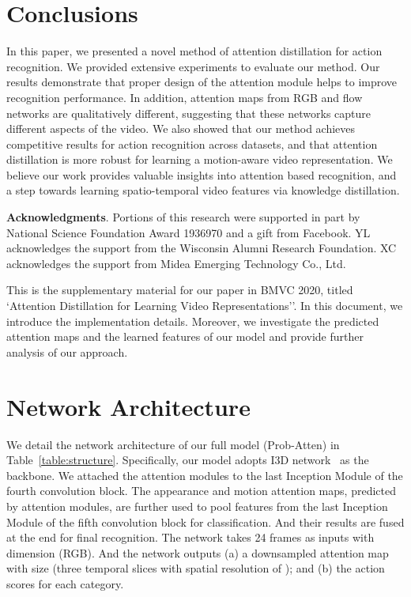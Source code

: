 \documentclass{bmvc2k}
\begin{document}
\section{Conclusions}
In this paper, we presented a novel method of attention distillation for action recognition. We provided extensive experiments to evaluate our method. Our results demonstrate that proper design of the attention module helps to improve recognition performance. In addition, attention maps from RGB and flow networks are qualitatively different, suggesting that these networks capture different aspects of the video. We also showed that our method achieves competitive results for action recognition across datasets, and that attention distillation is more robust for learning a motion-aware video representation. We believe our work provides valuable insights into attention based recognition, and a step towards learning spatio-temporal video features via knowledge distillation. 


\noindent \textbf{Acknowledgments}. Portions of this research were supported in part by National Science Foundation Award 1936970 and a gift from Facebook. YL acknowledges the support from the Wisconsin Alumni Research Foundation. XC acknowledges the support from Midea Emerging Technology Co., Ltd.


\newpage
This is the supplementary material for our paper in BMVC 2020, titled `Attention Distillation for Learning Video Representations''. In this document, we introduce the implementation details. Moreover, we investigate the predicted attention maps and the learned features of our model and provide further analysis of our approach.

\section*{Network Architecture}
We detail the network architecture of our full model (Prob-Atten) in Table~\ref{table:structure}. Specifically, our model adopts I3D network~\cite{carreira2017quo} as the backbone. We attached the attention modules to the last Inception Module of the fourth convolution block. The appearance and motion attention maps, predicted by attention modules, are further used to pool features from the last Inception Module of the fifth convolution block for classification. And their results are fused at the end for final recognition. The network takes 24 frames as inputs with dimension  (RGB). And the network outputs (a) a downsampled attention map with size  (three temporal slices with spatial resolution of ); and (b) the action scores for each category. 
\end{document}
